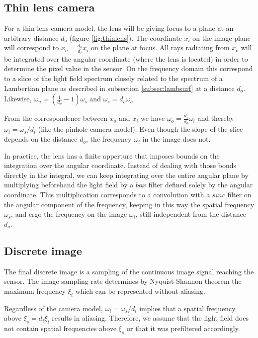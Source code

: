 \documentclass[acmtog,review,anonymous]{acmart}
\begin{document}
\subsection{Thin lens camera}

For a thin lens camera model, the lens will be giving focus to a plane at an arbitrary distance $d_{o}$ (figure \ref{fig:thinlens}). The coordinate $x_{i}$ on the image plane will correspond to $x_{o} = \frac{d_{o}}{d_{i}}x_{i}$ on the plane at focus. All rays radiating from $x_{o}$ will be integrated over the angular coordinate (where the lens is located) in order to determine the pixel value in the sensor. On the frequency domain this correspond to a slice of the light field spectrum closely related to the spectrum of a Lambertian plane as described in subsection \ref{subsec:lambsurf} at a distance $d_{o}$. Likewise, $\omega_{u} = (\frac{1}{d_{o}} - 1)\omega_{s}$ and $\omega_{s} = d_{o}\omega_{o}$.

From the correspondence between $x_{o}$ and $x_{i}$ we have $\omega_{o} = \frac{d_{i}}{d_{o}}\omega_{i}$ and thereby $\omega_{i} = \omega_{s}/d_{i}$ (like the pinhole camera model). Even though the slope of the slice depends on the distance $d_{o}$, the frequency $\omega_{i}$ in the image does not.

In practice, the lens has a finite apperture that imposes bounds on the integration over the angular coordinate. Instead of dealing with those bonds directly in the integral, we can keep integrating over the entire angular plane by multiplying beforehand the light field by a $box$ filter defined solely by the angular coordinate. This multiplication corresponds to a convolution with a $sinc$ filter on the angular component of the frequency, keeping in this way the spatial frequency $\omega_{s}$, and ergo the frequency on the image $\omega_{i}$, still independent from the distance $d_{o}$.

\subsection{Discrete image}

The final discrete image is a sampling of the continuous image signal reaching the sensor. The image sampling rate determines by Nyquist-Shannon theorem the maximum frequency $\xi_{i}$ which can be represented without aliasing.

Regardless of the camera model, $\omega_{i} = \omega_{s}/d_{i}$ implies that a spatial frequency above $\xi_{s} = d_{i}\xi_{i}$ results in aliasing. Therefore, we assume that the light field does not contain spatial frequencies above $\xi_{s}$ or that it was prefiltered accordingly.
\end{document}
